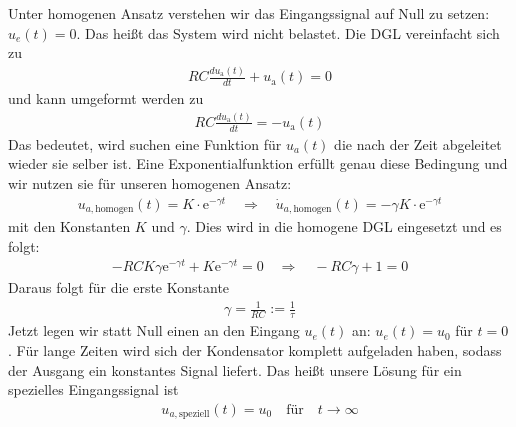 \documentclass[letterpaper,10pt,english]{jupyterBook}
\begin{document}
\sphinxAtStartPar
{}
Unter homogenen Ansatz verstehen wir das Eingangssignal auf Null zu setzen: \(u_e(t) = 0\). Das heißt das System wird nicht belastet. Die DGL vereinfacht sich zu
\begin{equation*}
\begin{split}RC \frac{du_\mathrm a (t)}{dt} + u_\mathrm a (t) = 0\end{split}
\end{equation*}
\sphinxAtStartPar
und kann umgeformt werden zu
\begin{equation*}
\begin{split}RC \frac{du_\mathrm a (t)}{dt} = -u_\mathrm a (t)\end{split}
\end{equation*}
\sphinxAtStartPar
Das bedeutet, wird suchen eine Funktion für \(u_a(t)\) die nach der Zeit abgeleitet wieder sie selber ist. Eine Exponentialfunktion erfüllt genau diese Bedingung und wir nutzen sie für unseren homogenen Ansatz:
\begin{equation*}
\begin{split}u_{a,\mathrm{homogen}}(t) = K \cdot \mathrm e^{-\gamma t} \quad \Rightarrow \quad \dot u_{a,\mathrm{homogen}}(t) = -\gamma K \cdot \mathrm e^{-\gamma t}\end{split}
\end{equation*}
\sphinxAtStartPar
mit den Konstanten \(K\) und \(\gamma\). Dies wird in die homogene DGL eingesetzt und es folgt:
\begin{equation*}
\begin{split}-RCK\gamma \mathrm e^{-\gamma t} + K \mathrm e^{-\gamma t} = 0 \quad \Rightarrow \quad -RC\gamma + 1 = 0\end{split}
\end{equation*}
\sphinxAtStartPar
Daraus folgt für die erste Konstante
\begin{equation*}
\begin{split}\gamma = \frac{1}{RC} := \frac{1}{\tau}\end{split}
\end{equation*}
\sphinxAtStartPar
{}
Jetzt legen wir statt Null einen  an den Eingang \(u_e(t)\) an: \(u_e(t) = u_0\) für \(t = 0\). Für lange Zeiten wird sich der Kondensator komplett aufgeladen haben, sodass der Ausgang ein konstantes Signal liefert. Das heißt unsere Lösung für ein spezielles Eingangssignal ist
\begin{equation*}
\begin{split}u_{a,\mathrm{speziell}}(t) = u_0 \quad \mathrm{für} \quad t \rightarrow \infty\end{split}
\end{equation*}
\end{document}
